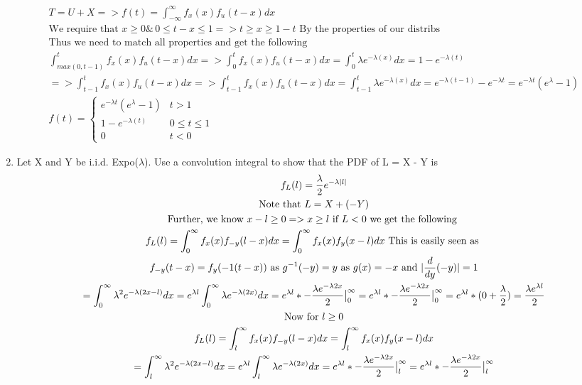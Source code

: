 \documentclass[11pt]{article}
\begin{document}
\begin{enumerate}
\begin{gather}
	T=U+X=>f(t)=\int_{-\infty}^{\infty}f_x(x)f_u(t-x)dx \\
	\text{We require that } x\ge0 \& \, 0\le t-x\le 1 => t\ge x\ge 1-t \text{ By the properties of our distribs} \\
	\text{Thus we need to match all properties and get the following}\\
	\int_{max(0,t-1)}^{t}f_x(x)f_u(t-x)dx => \int_{0}^{t}f_x(x)f_u(t-x)dx = \int_{0}^{t} \lambda e^{-\lambda(x)} dx = 1- e^{-\lambda(t)}\\
	=>\int_{t-1}^{t}f_x(x)f_u(t-x)dx => \int_{t-1}^{t}f_x(x)f_u(t-x)dx = \int_{t-1}^{t} \lambda e^{-\lambda(x)} dx = e^{-\lambda(t-1)}- e^{-\lambda t} = e^{-\lambda t}(e^\lambda -1)\\
	f(t)=\begin{cases}
	e^{-\lambda t}(e^\lambda -1) & t > 1 \\
	1- e^{-\lambda(t)} & 0\le t \le 1 \\
	0 &t<0
	\end{cases}
\end{gather}
\item Let X and Y be i.i.d. Expo($\lambda$). Use a convolution integral to show that the PDF of L = X - Y is
\begin{gather}
	f_L(l) = \frac{\lambda}{2}e^{-\lambda|l|}\\
	\text{Note that } L = X + (-Y)\\
	\text{Further, we  know } x-l\ge0 => x\ge l \text{ if } L<0
	\text{ we get the following }\\
	f_L(l) = \int_{0}^{\infty}f_x(x)f_{-y}(l-x)dx =  \int_{0}^{\infty}f_x(x)f_{y}(x-l)dx \text{ This is easily seen as }\\
	f_{-y}(t-x) = f_{y}(-1(t-x)) \text{ as }g^{-1}(-y)=y \text{ as } g(x) = -x \text{ and } |\frac{d}{dy}(-y)| = 1\\
	=\int_{0}^{\infty}\lambda^2 e^{-\lambda(2x-l)}dx = e^{\lambda l}\int_{0}^{\infty}\lambda e^{-\lambda(2x)}dx = e^{\lambda l} * -\frac{\lambda e^{-\lambda 2x}}{2}\big{|}_0^\infty =  e^{\lambda l} * -\frac{\lambda e^{-\lambda 2x}}{2}\big{|}_0^\infty = e^{\lambda l} * (0+\frac{\lambda}{2}) = \frac{\lambda e^{\lambda l}}{2}\\
	\text{Now for } l\ge 0\\
	f_L(l) = \int_{l}^{\infty}f_x(x)f_{-y}(l-x)dx =  \int_{l}^{\infty}f_x(x)f_{y}(x-l)dx \\
	=\int_{l}^{\infty}\lambda^2 e^{-\lambda(2x-l)}dx = e^{\lambda l}\int_{l}^{\infty}\lambda e^{-\lambda(2x)}dx = e^{\lambda l} * -\frac{\lambda e^{-\lambda 2x}}{2}\big{|}_l^\infty =  e^{\lambda l} * -\frac{\lambda e^{-\lambda 2x}}{2}\big{|}_l^\infty \\

\end{gather}
\end{enumerate}
\end{document}
